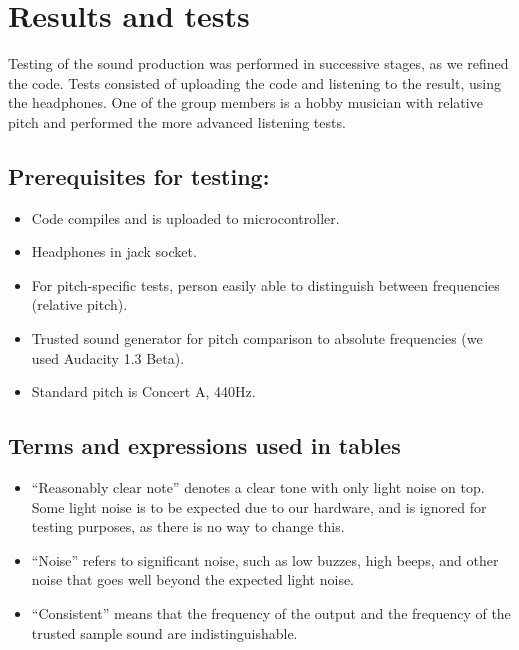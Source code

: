 \section{Results and tests}

Testing of the sound production was performed in successive stages, as
we refined the code. Tests consisted of uploading the code and listening
to the result, using the headphones. One of the group members is a hobby
musician with relative pitch and performed the more advanced listening
tests.

\subsection{Prerequisites for testing:}
\begin{itemize}
\item Code compiles and is uploaded to microcontroller.
\item Headphones in jack socket.
\item For pitch-specific tests, person easily able to distinguish between frequencies (relative pitch).
\item Trusted sound generator for pitch comparison to absolute frequencies (we used Audacity 1.3 Beta).
\item Standard pitch is Concert A, 440Hz.
\end{itemize}

\subsection{Terms and expressions used in tables}
\begin{itemize}
\item ``Reasonably clear note'' denotes a clear tone with only light
noise on top. Some light noise is to be expected due to our hardware,
and is ignored for testing purposes, as there is no way to change this.
\item ``Noise'' refers to significant noise, such as low buzzes, high
beeps, and other noise that goes well beyond the expected light noise.
\item ``Consistent'' means that the frequency of the output and the
frequency of the trusted sample sound are indistinguishable.
\end{itemize}

